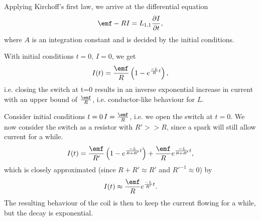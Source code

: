 \documentclass[a4paper, 12pt]{article}
\begin{document}
            Applying Kirchoff's first law, we arrive at the differential equation
            \begin{equation}
                \emf - RI = L_{1,1}\frac{\partial I}{\partial t},
            \end{equation}
            where $A$ is an integration constant and is decided by the initial conditions.

            With initial conditions $t=0,\, I=0$, we get 
            \begin{equation}
                I(t) = \frac{\emf}{R}\left(1-e^{\frac{-L}{R}t}\right),
            \end{equation}
            i.e. closing the switch at t=0 results in an inverse exponential increase in current 
            with an upper bound of $\frac{\emf}{R}$, i.e. conductor-like behaviour for $L$.

            Consider initial conditions $t=0\, I = \frac{\emf}{R}$, i.e. we open the switch at $t=0$.
            We now consider the switch as a resistor with $R' >> R$, since a spark will still allow current for a while.
            \begin{equation}
                I(t) = \frac{\emf}{R'}\left(1-e^{\frac{-L}{R+R'}t}\right) + \frac{\emf}{R} e^{\frac{-L}{R+R'}t},
            \end{equation}
            which is closely approximated (since $R+R' \approx R'$ and $R'^{-1} \approx 0$) by
            \begin{equation}
                I(t) \approx \frac{\emf}{R}e^{\frac{-L}{R'}t}.
            \end{equation}
            The resulting behaviour of the coil is then to keep the current flowing for a while, but the decay is exponential.
            
\end{document}
